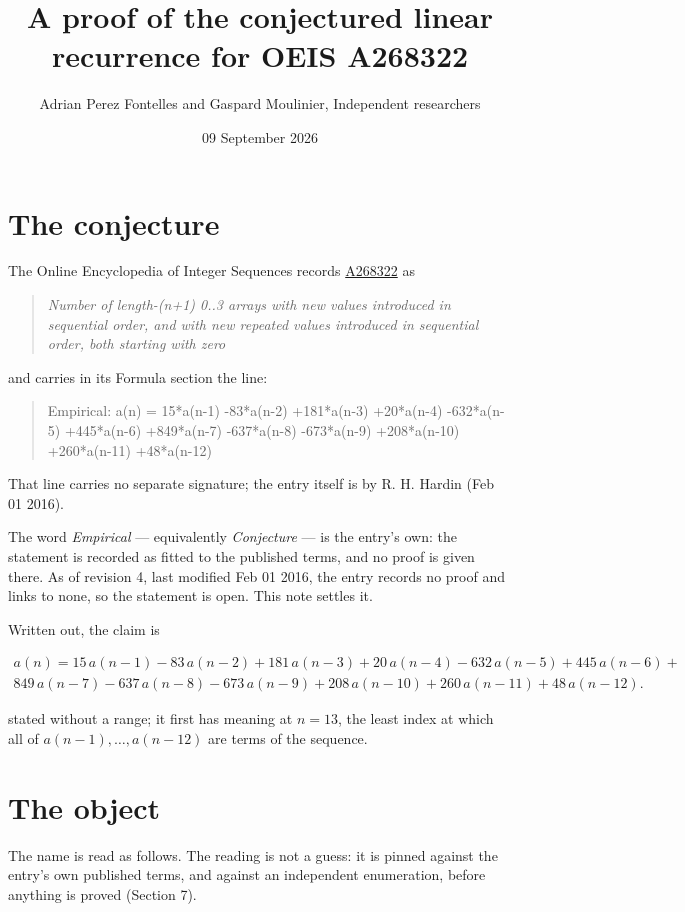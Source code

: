 \documentclass[11pt]{article}
\title{A proof of the conjectured linear recurrence for OEIS A268322}
\author{Adrian Perez Fontelles and Gaspard Moulinier, Independent researchers}
\date{09 September 2026}
\theoremstyle{definition}
\begin{document}
\maketitle
\section{The conjecture}

The Online Encyclopedia of Integer Sequences records \href{https://oeis.org/A268322}{A268322} as

\begin{quote}\itshape Number of length-(n+1) 0..3 arrays with new values introduced in sequential order, and with new repeated values introduced in sequential order, both starting with zero\end{quote}

and carries in its Formula section the line:

\begin{quote}\ttfamily Empirical: a(n) = 15*a(n-1) -83*a(n-2) +181*a(n-3) +20*a(n-4) -632*a(n-5) +445*a(n-6) +849*a(n-7) -637*a(n-8) -673*a(n-9) +208*a(n-10) +260*a(n-11) +48*a(n-12)\end{quote}

That line carries no separate signature; the entry itself is by R. H. Hardin (Feb 01 2016).

The word {\itshape Empirical} --- equivalently {\itshape Conjecture} --- is the entry's own: the statement is recorded as fitted to the published terms, and no proof is given there. As of revision 4, last modified Feb 01 2016, the entry records no proof and links to none, so the statement is open. This note settles it.

Written out, the claim is

\begin{multline*} a(n) = 15\,a(n-1) - 83\,a(n-2) + 181\,a(n-3) + 20\,a(n-4) - 632\,a(n-5) + 445\,a(n-6) + \\ 849\,a(n-7) - 637\,a(n-8) - 673\,a(n-9) + 208\,a(n-10) + 260\,a(n-11) + 48\,a(n-12). \end{multline*}

stated without a range; it first has meaning at $n = 13$, the least index at which all of $a(n-1),\dots,a(n-12)$ are terms of the sequence.

\section{The object}

The name is read as follows. The reading is not a guess: it is pinned against the entry's own published terms, and against an independent enumeration, before anything is proved (Section 7).
\end{document}

